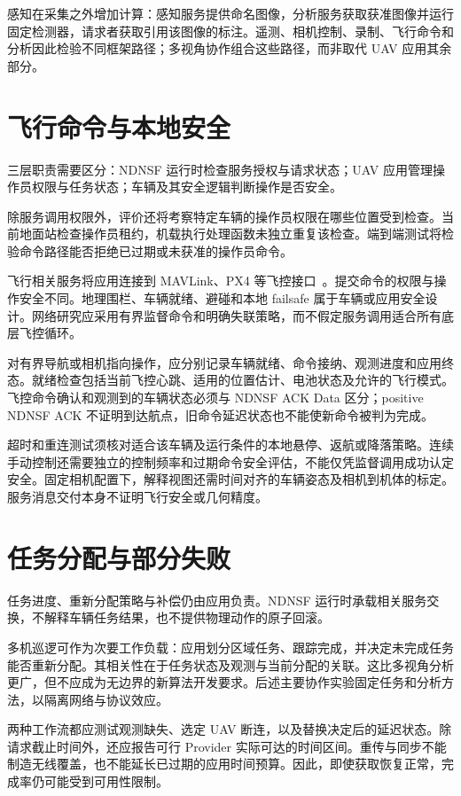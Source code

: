 感知在采集之外增加计算：感知服务提供命名图像，分析服务获取获准图像并运行固定检测器，请求者获取引用该图像的标注。遥测、相机控制、录制、飞行命令和分析因此检验不同框架路径；多视角协作组合这些路径，而非取代 UAV 应用其余部分。

\section{飞行命令与本地安全}

三层职责需要区分：NDNSF 运行时检查服务授权与请求状态；UAV 应用管理操作员权限与任务状态；车辆及其安全逻辑判断操作是否安全。

除服务调用权限外，评价还将考察特定车辆的操作员权限在哪些位置受到检查。当前地面站检查操作员租约，机载执行处理函数未独立重复该检查。端到端测试将检验命令路径能否拒绝已过期或未获准的操作员命令。

飞行相关服务将应用连接到 MAVLink、PX4 等飞控接口~\cite{mavlink-survey,px4}。提交命令的权限与操作安全不同。地理围栏、车辆就绪、避碰和本地 failsafe 属于车辆或应用安全设计。网络研究应采用有界监督命令和明确失联策略，而不假定服务调用适合所有底层飞控循环。

对有界导航或相机指向操作，应分别记录车辆就绪、命令接纳、观测进度和应用终态。就绪检查包括当前飞控心跳、适用的位置估计、电池状态及允许的飞行模式。飞控命令确认和观测到的车辆状态必须与 NDNSF ACK Data 区分；positive NDNSF ACK 不证明到达航点，旧命令延迟状态也不能使新命令被判为完成。

超时和重连测试须核对适合该车辆及运行条件的本地悬停、返航或降落策略。连续手动控制还需要独立的控制频率和过期命令安全评估，不能仅凭监督调用成功认定安全。固定相机配置下，解释视图还需时间对齐的车辆姿态及相机到机体的标定。服务消息交付本身不证明飞行安全或几何精度。

\section{任务分配与部分失败}
任务进度、重新分配策略与补偿仍由应用负责。NDNSF 运行时承载相关服务交换，不解释车辆任务结果，也不提供物理动作的原子回滚。

多机巡逻可作为次要工作负载：应用划分区域任务、跟踪完成，并决定未完成任务能否重新分配。其相关性在于任务状态及观测与当前分配的关联。这比多视角分析更广，但不应成为无边界的新算法开发要求。后述主要协作实验固定任务和分析方法，以隔离网络与协议效应。

两种工作流都应测试观测缺失、选定 UAV 断连，以及替换决定后的延迟状态。除请求截止时间外，还应报告可行 Provider 实际可达的时间区间。重传与同步不能制造无线覆盖，也不能延长已过期的应用时间预算。因此，即使获取恢复正常，完成率仍可能受到可用性限制。
